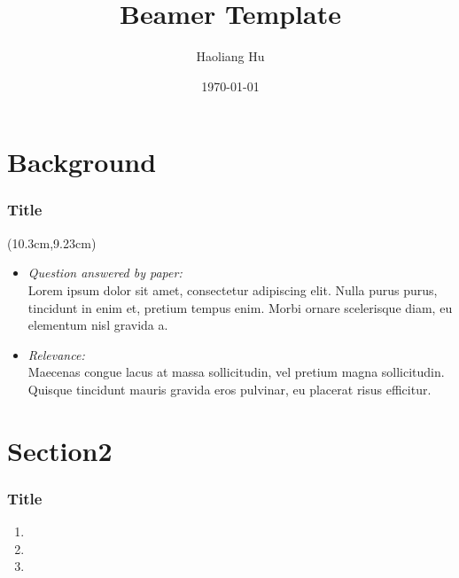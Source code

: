 \documentclass[13pt]{beamer}
\title {Beamer Template}
\author{Haoliang Hu\\[0.3cm]  
}
\date{\today}
\begin{document}
\begin{frame}
\titlepage
\end{frame}


\section{Background}
\setcounter{subsection}{1} %

\begin{frame}[label=title1]\frametitle{Title}
	\begin{textblock*}{3cm}(10.3cm,9.23cm)
		\hyperlink{appendix1}{}
	\end{textblock*}
\begin{itemize}		
	\item \textit{Question answered by paper:}\\[0.1cm]
	 Lorem ipsum dolor sit amet, consectetur adipiscing elit. Nulla purus purus, tincidunt in enim et, pretium tempus enim. Morbi ornare scelerisque diam, eu elementum nisl gravida a.\pause\item \textit{Relevance:} \\[0.1cm]
	Maecenas congue lacus at massa sollicitudin, vel pretium magna sollicitudin. Quisque tincidunt mauris gravida eros pulvinar, eu placerat risus efficitur.
\end{itemize}
\end{frame}


\section{Section2}
\setcounter{subsection}{1} %

\begin{frame}[label=title2]\frametitle{Title}
\begin{enumerate}
	\item 
	\pause\item 
	\pause\item 
\end{enumerate}		
\end{frame}
\end{document}
